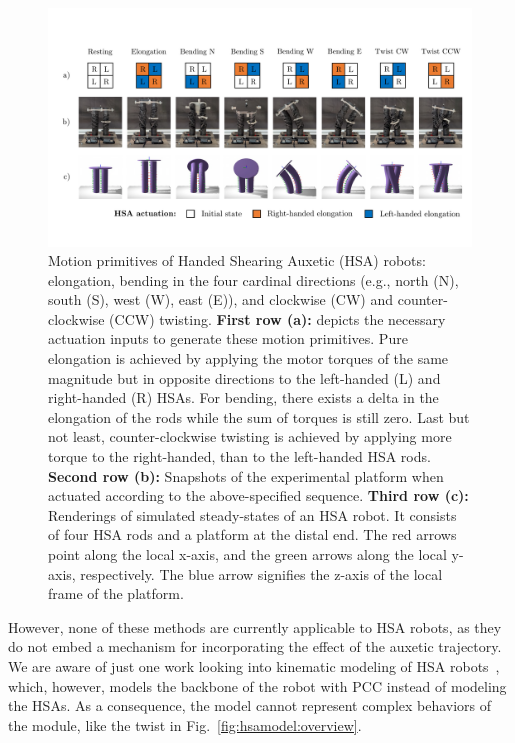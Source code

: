 \begin{figure}[hbt]
    \centering
    \includegraphics[width=1.0\textwidth]{hsamodel/figures/motion_primitives/motion_primitives_v2_compressed.pdf}
    
    \caption{Motion primitives of Handed Shearing Auxetic (HSA) robots: elongation, bending in the four cardinal directions (e.g., north (N), south (S), west (W), east (E)), and clockwise (CW) and counter-clockwise (CCW) twisting.
    \textbf{First row (a):} depicts the necessary actuation inputs to generate these motion primitives. Pure elongation is achieved by applying the motor torques of the same magnitude but in opposite directions to the left-handed (L) and right-handed (R) HSAs. For bending, there exists a delta in the elongation of the rods while the sum of torques is still zero. Last but not least, counter-clockwise twisting is achieved by applying more torque to the right-handed, than to the left-handed HSA rods.
    \textbf{Second row (b):} Snapshots of the experimental platform when actuated according to the above-specified sequence.
    \textbf{Third row (c):} Renderings of simulated steady-states of an HSA robot. It consists of four HSA rods and a platform at the distal end. The red arrows point along the local x-axis, and the green arrows along the local y-axis, respectively. The blue arrow signifies the z-axis of the local frame of the platform.}\label{fig:hsamodel:motion_primitives}
\end{figure}

However, none of these methods are currently applicable to HSA robots, as they do not embed a mechanism for incorporating the effect of the auxetic trajectory.
%
We are aware of just one work looking into kinematic modeling of HSA robots~\cite{garg2022kinematic}, which, however, models the backbone of the robot with \gls{PCC} instead of modeling the HSAs. As a consequence, the model cannot represent complex behaviors of the module, like the twist in Fig.~\ref{fig:hsamodel:overview}. 

